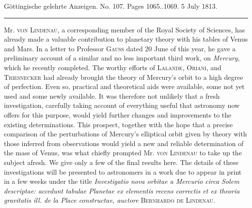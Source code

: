 \clearpage
{}
\begin{center}\small Göttingische gelehrte Anzeigen. No. 107. Pages 1065..1069. 5 July 1813.\\[3pt]\rule{.72\linewidth}{.3pt}\end{center}

Mr. \textsc{von Lindenau}, a corresponding member of the Royal Society of Sciences, has already made a valuable contribution to planetary theory with his tables of Venus and Mars. In a letter to Professor \textsc{Gauss} dated 20 June of this year, he gave a preliminary account of a similar and no less important third work, on \emph{Mercury}, which he recently completed. The worthy efforts of \textsc{Lalande}, \textsc{Oriani}, and \textsc{Triesnecker} had already brought the theory of Mercury's orbit to a high degree of perfection. Even so, practical and theoretical aids were available, some not yet used and some newly available. It was therefore not unlikely that a fresh investigation, carefully taking account of everything useful that astronomy now offers for this purpose, would yield further changes and improvements to the existing determinations. This prospect, together with the hope that a precise comparison of the perturbations of Mercury's elliptical orbit given by theory with those inferred from observations would yield a new and reliable determination of the mass of Venus, was what chiefly prompted Mr. \textsc{von Lindenau} to take up the subject afresh. We give only a few of the final results here. The details of these investigations will be presented to astronomers in a work due to appear in print in a few weeks under the title \emph{Investigatio nova orbitae a Mercurio circa Solem descriptae: accedunt tabulae Planetae ex elementis recens correctis et ex theoria gravitatis ill. de la Place constructae, auctore} \textsc{Bernhardo de Lindenau}.

